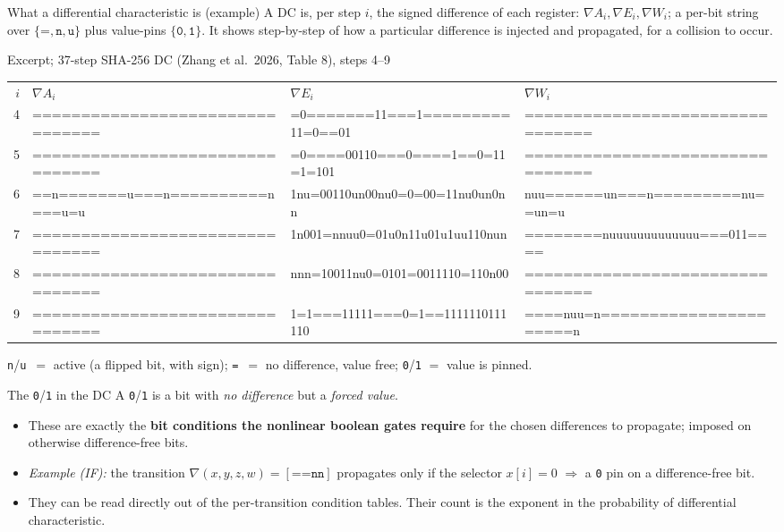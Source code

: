 \documentclass[aspectratio=169,9pt]{beamer}
\newcommand{\nn}{\texttt{n}}
\newcommand{\uu}{\texttt{u}}
\newcommand{\eq}{\texttt{=}}
\newcommand{\key}[1]{\textcolor{key}{\textbf{#1}}}
\begin{document}
\begin{frame}{What a differential characteristic is (example)}
 A DC is, per step $i$, the signed difference of each register: $\nabla A_i,\nabla E_i,\nabla W_i$; a per-bit string over $\{\eq,\nn,\uu\}$ plus value-pins $\{\texttt{0},\texttt{1}\}$. It shows step-by-step of how a particular difference is injected and propagated, for a collision to occur. 
 
\begin{block}{Excerpt; 37-step SHA-256 DC (Zhang et al.\ 2026, Table 8), steps 4--9}
\centering\ttfamily\footnotesize
\begin{tabular}{r l l l}
$i$ & $\nabla A_i$ & $\nabla E_i$ & $\nabla W_i$\\
4 & ================================ & =0=======11===1=========11=0==01 & ================================\\
5 & ================================ & =0====00110===0====1==0=11=1=101 & ================================\\
6 & ==n=======u===n==========n===u=u & 1nu=00110un00nu0=0=00=11nu0un0nn & nuu======un===n=========nu==un=u\\
7 & ================================ & 1n001=nnuu0=01u0n11u01u1uu110nun & ========nuuuuuuuuuuuuu===011====\\
8 & ================================ & nnn=10011nu0=0101=0011110=110n00 & ================================\\
9 & ================================ & 1=1===11111===0=1==1111110111110 & ====nuu=n======================n\\
\end{tabular}
\end{block}
\small \nn/\uu\ $=$ active (a flipped bit, with sign); \eq\ $=$ no difference, value free; \texttt{0}/\texttt{1} $=$ value is pinned.
\end{frame}

\begin{frame}{The \texttt{0}/\texttt{1} in the DC}
A \texttt{0}/\texttt{1} is a bit with \emph{no difference} but a \emph{forced value}. 
\begin{itemize}
  \item These are exactly the \key{bit conditions the nonlinear boolean gates require} for the chosen differences to propagate; imposed on otherwise difference-free bits.
  \item \emph{Example (IF):} the transition $\nabla(x,y,z,w)=[\eq\eq\nn\nn]$ propagates only if the selector $x[i]=0$ $\Rightarrow$ a \texttt{0} pin on a difference-free bit.
  \item  They can be read directly out of the per-transition condition tables. Their count is the exponent in the probability of differential characteristic.
\end{itemize}
\end{frame}
\end{document}
